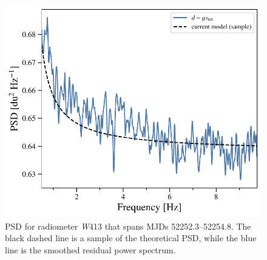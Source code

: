 \documentclass[twocolumn]{../../common/aa}
\newcommand{\W}[0]{\textit W}
\begin{document}
\begin{figure}
	\includegraphics[width=\columnwidth]{figures/ps_test_W4_det1_zoom.pdf}
	\caption{PSD for radiometer \W413 that spans MJDs 52252.3--52254.8. 
	The black dashed line is a sample of the theoretical PSD, while the blue line is the smoothed residual power spectrum.
	}
	\label{fig:W413_psd_zoom}
\end{figure}









%





\end{document}

